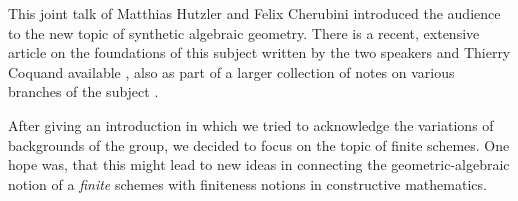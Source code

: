 This joint talk of Matthias Hutzler and Felix Cherubini introduced the audience to the new topic of synthetic algebraic geometry. There is a recent, extensive article on the foundations of this subject written by the two speakers and Thierry Coquand available \cite{draft}, also as part of a larger collection of notes on various branches of the subject \cite{sag-project}.

After giving an introduction in which we tried to acknowledge the variations of backgrounds of the group, we decided to focus on the topic of finite schemes. One hope was, that this might lead to new ideas in connecting the geometric-algebraic notion of a \emph{finite} schemes with finiteness notions in constructive mathematics.

